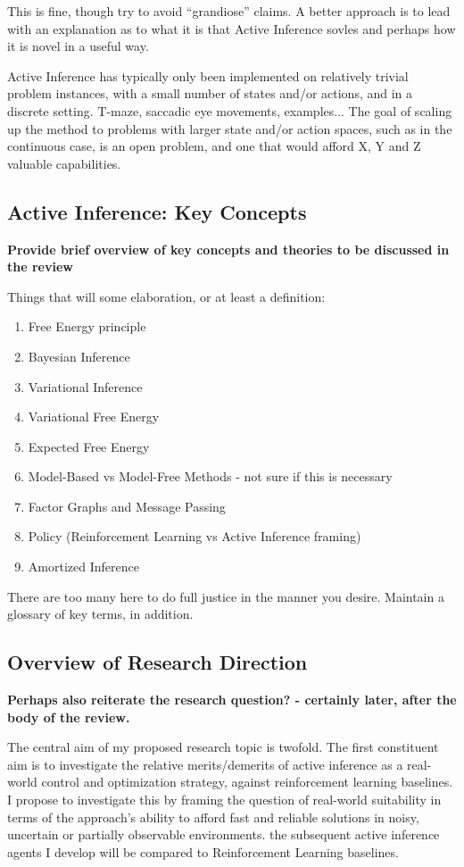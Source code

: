 \documentclass[12pt, oneside]{article}
\begin{document}
This is fine, though try to avoid ``grandiose'' claims. A better approach is to lead with an explanation as to what it is that Active Inference sovles and perhaps how it is novel in a useful way. 

Active Inference has typically only been implemented on relatively trivial problem instances, with a small number of states and/or actions, and in a discrete setting. T-maze, saccadic eye movements, examples... The goal of scaling up the method to problems with larger state and/or action spaces, such as in the continuous case, is an open problem, and one that would afford X, Y and Z valuable capabilities.  

\subsection{Active Inference: Key Concepts} 
\textbf{Provide brief overview of key concepts and theories to be discussed in the review}

Things that will some elaboration, or at least a definition:

\begin{enumerate}
	\item Free Energy principle
	\item Bayesian Inference
	\item Variational Inference
	\item Variational Free Energy
	\item Expected Free Energy
	\item Model-Based vs Model-Free Methods - not sure if this is necessary
	\item Factor Graphs and Message Passing
	\item Policy (Reinforcement Learning vs Active Inference framing)
	\item Amortized Inference
\end{enumerate}

There are too many here to do full justice in the manner you desire. Maintain a glossary of key terms, in addition.

\subsection{Overview of Research Direction}

\textbf{Perhaps also reiterate the research question? - certainly later, after the body of the review.}

The central aim of my proposed research topic is twofold. The first constituent aim is to investigate the relative merits/demerits of active inference as a real-world control and optimization strategy, against reinforcement learning baselines. I propose to investigate this by framing the question of real-world suitability in terms of the approach's ability to afford fast and reliable solutions in noisy, uncertain or partially observable environments. the subsequent active inference agents I develop will be compared to Reinforcement Learning baselines. 
\end{document}
